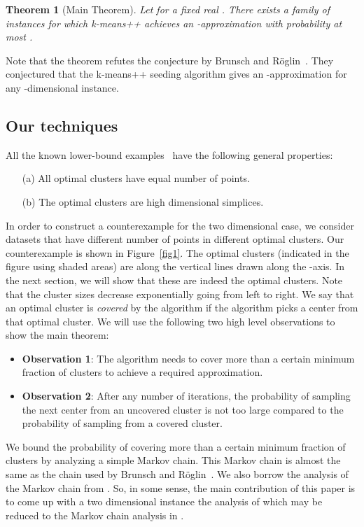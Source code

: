 \documentclass[11pt]{article}
\newtheorem{theorem}{Theorem}
\begin{document}
\begin{theorem}[Main Theorem]\label{thm:main}
Let  for a fixed real . 
There exists a family of instances for which k-means++ achieves an -approximation with probability at most .
\end{theorem}

Note that the theorem refutes the conjecture by Brunsch and R\"{o}glin~\cite{br12}.
They conjectured that the k-means++ seeding algorithm gives an -approximation for any -dimensional instance.

\subsection{Our techniques}
All the known lower-bound examples~\cite{ArthurV07,AggarwalDK09,br12} have the following general properties:
\begin{enumerate}
\item[(a)] All optimal clusters have equal number of points.
\item[(b)] The optimal clusters are high dimensional simplices.
\end{enumerate}
In order to construct a counterexample for the two dimensional case, we consider datasets that have different number of points in different optimal clusters. 
Our counterexample is shown in Figure~\ref{fig1}.
The optimal clusters (indicated in the figure using shaded areas) are along the vertical lines drawn along the -axis.
In the next section, we will show that these are indeed the optimal clusters.
Note that the cluster sizes decrease exponentially going from left to right.
We say that an optimal cluster is {\em covered} by the algorithm if the algorithm picks a center from that optimal cluster.
We will use the following two high level observations to show the main theorem:
\begin{itemize}
\item {\bf Observation 1}: The algorithm needs to cover more than a certain minimum fraction of clusters to achieve a required approximation.

\item {\bf Observation 2}: After any number of iterations, the probability of sampling the next center from an uncovered cluster is not too large compared to the probability of sampling from a covered cluster.
\end{itemize}

We bound the probability of covering more than a certain minimum fraction of clusters by analyzing a simple Markov chain. This Markov chain is almost the same as the chain used by Brunsch and R\"{o}glin~\cite{br12}. 
We also borrow the analysis of the Markov chain from \cite{br12}.
So, in some sense, the main contribution of this paper is to come up with a two dimensional instance the analysis of which may be reduced to the Markov chain analysis in \cite{br12}.
\end{document}
